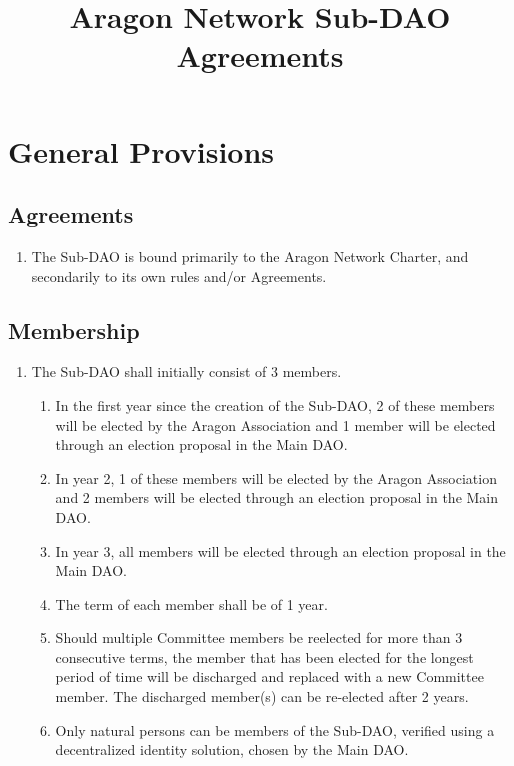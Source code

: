 
\title{Aragon Network Sub-DAO Agreements}



\mytitle

\section{General Provisions}

\subsection{Agreements}
\begin{enumerate}
	\item The Sub-\ac{DAO} is bound primarily to the Aragon Network Charter, and secondarily to its own rules and/or Agreements.
\end{enumerate}


\subsection{Membership}

\begin{enumerate}
	\item The Sub-\ac{DAO} shall initially consist of 3 members.
	\begin{enumerate}
		\item In the first year since the creation of the Sub-\ac{DAO}, 2 of these members will be elected by the Aragon Association and 1 member will be elected through an election proposal in the Main \ac{DAO}.
		\item In year 2, 1 of these members will be elected by the Aragon Association and 2 members will be elected through an election proposal in the Main \ac{DAO}.
		\item In year 3, all members will be elected through an election proposal in the Main \ac{DAO}.
		\item The term of each member shall be of 1 year.
		\item Should multiple Committee members be reelected for more than 3 consecutive terms, the member that has been elected for the longest period of time will be discharged and replaced with a new Committee member.
		The discharged member(s) can be re-elected after 2 years.
		\item Only natural persons can be members of the Sub-\ac{DAO}, verified using a decentralized identity solution, chosen by the Main \ac{DAO}.
	\end{enumerate}
\end{enumerate}


